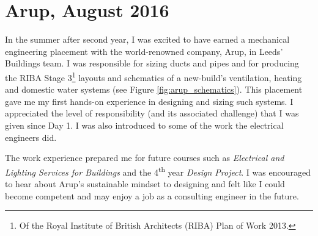 

\section{Arup, August 2016}


In the summer after second year, I was excited to have earned a mechanical engineering placement with the world-renowned company, Arup, in Leeds' Buildings team.
I was responsible for sizing ducts and pipes and for producing the RIBA Stage 3\footnote{Of the Royal Institute of British Architects (RIBA) Plan of Work 2013.}
layouts and schematics of a new-build’s ventilation, heating and domestic water systems (see Figure \ref{fig:arup_schematics}).
This placement gave me my first hands-on experience in designing and sizing such systems.
I appreciated the level of responsibility (and its associated challenge) that I was given since Day 1.
I was also introduced to some of the work the electrical engineers did.

The work experience prepared me for future courses such as \textit{Electrical and Lighting Services for Buildings} and the 4\textsuperscript{th} year \textit{Design Project}.
I was encouraged to hear about Arup's sustainable mindset to designing and felt like I could become competent and may enjoy a job as a consulting engineer in the future.


